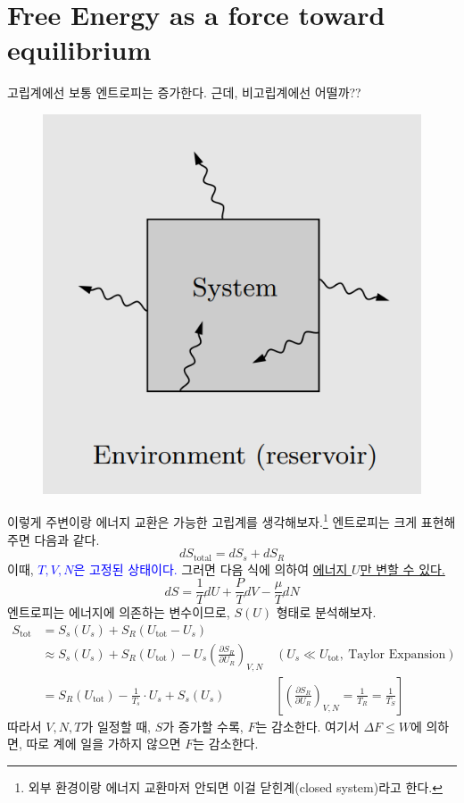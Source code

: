 \documentclass{article}
\begin{document}
\section{Free Energy as a force toward equilibrium}

고립계에선 보통 엔트로피는 증가한다. 근데, 비고립계에선 어떨까??

\begin{figure}[h]
\centering
\includegraphics[width=0.25\linewidth]{images/fig2_1.png}
\end{figure}

이렇게 주변이랑 에너지 교환은 가능한 고립계를 생각해보자.\footnote{외부 환경이랑 에너지 교환마저 안되면 이걸 닫힌계(closed system)라고 한다.} 엔트로피는 크게 표현해주면 다음과 같다.
\begin{equation}
    dS_{\text{total}} = dS_s + dS_R 
\end{equation}
이때, \textcolor{blue}{$T,V,N$은 고정된 상태이다.} 그러면 다음 식에 의하여 \underline{에너지 $U$만 변할 수 있다.}
\begin{equation}
    dS = \frac{1}{T}dU + \frac{P}{T}dV - \frac{\mu}{T} dN
\end{equation}
엔트로피는 에너지에 의존하는 변수이므로, $S(U)$ 형태로 분석해보자.
\begin{align}
    S_{\text{tot}} &= S_s(U_s) + S_R (U_{\text{tot}} - U_s)\\ \nonumber
    &\approx S_s(U_s) + S_R (U_{\text{tot}}) - U_s \left( \frac{\partial S_R}{\partial U_R} \right)_{V,N} \quad (U_s \ll U_\text{tot}, \ \text{Taylor Expansion})\\
    &= S_R (U_{\text{tot}}) - \frac{1}{T_s} \cdot U_s + S_s (U_s) \qquad \qquad  \left[ \left( \frac{\partial S_R}{\partial U_R} \right)_{V,N} = \frac{1}{T_R} = \frac{1}{T_S} \right]
\end{align}
따라서 $V,N,T$가 일정할 때, $S$가 증가할 수록, $F$는 감소한다. 여기서 $\Delta F \leq W$에 의하면, 따로 계에 일을 가하지 않으면 $F$는 감소한다.

\newpage
\end{document}
